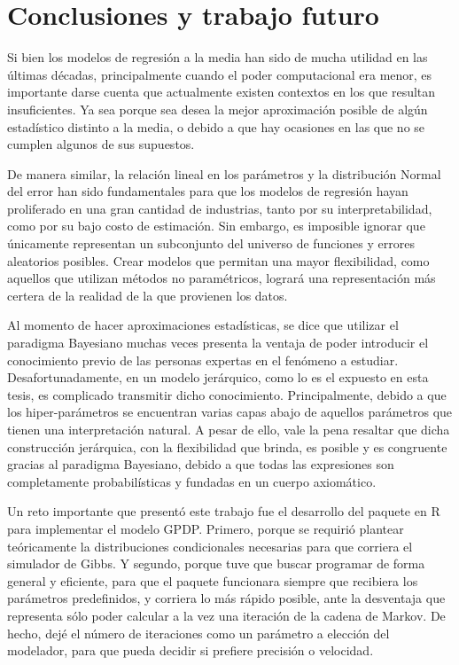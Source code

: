 \chapter[Conclusiones y trabajo futuro]{Conclusiones y trabajo futuro}

Si bien los modelos de regresi\'on a la media han sido de mucha utilidad en las \'ultimas d\'ecadas, principalmente cuando el poder computacional era menor, es importante darse cuenta que actualmente existen contextos en los que resultan insuficientes. Ya sea porque sea desea la mejor aproximaci\'on posible de alg\'un estad\'istico distinto a la media, o debido a que hay ocasiones en las que no se cumplen algunos de sus supuestos.

De manera similar, la relaci\'on lineal en los par\'ametros y la distribuci\'on Normal del error han sido fundamentales para que los modelos de regresi\'on hayan proliferado en una gran cantidad de industrias, tanto por su interpretabilidad, como por su bajo costo de estimaci\'on. Sin embargo, es imposible ignorar que \'unicamente representan un subconjunto del universo de funciones y errores aleatorios posibles. Crear modelos que permitan una mayor flexibilidad, como aquellos que utilizan m\'etodos no param\'etricos, lograr\'a una representaci\'on m\'as certera de la realidad de la que provienen los datos.

Al momento de hacer aproximaciones estad\'isticas, se dice que utilizar el paradigma Bayesiano muchas veces presenta la ventaja de poder introducir el conocimiento previo de las personas expertas en el fen\'omeno a estudiar. Desafortunadamente, en un modelo jer\'arquico, como lo es el expuesto en esta tesis, es complicado transmitir dicho conocimiento. Principalmente, debido a que los hiper-par\'ametros se encuentran varias capas abajo de aquellos par\'ametros que tienen una interpretaci\'on natural. A pesar de ello, vale la pena resaltar que dicha construcci\'on jer\'arquica, con la flexibilidad que brinda, es posible y es congruente gracias al paradigma Bayesiano, debido a que todas las expresiones son completamente probabil\'isticas y fundadas en un cuerpo axiom\'atico. 

Un reto importante que present\'o este trabajo fue el desarrollo del paquete en R para implementar el modelo GPDP. Primero, porque se requiri\'o plantear te\'oricamente la distribuciones condicionales necesarias para que corriera el simulador de Gibbs. Y segundo, porque tuve que buscar programar de forma general y eficiente, para que el paquete funcionara siempre que recibiera los par\'ametros predefinidos, y corriera lo m\'as r\'apido posible, ante la desventaja que representa s\'olo poder calcular a la vez una iteraci\'on de la cadena de Markov. De hecho, dej\'e el n\'umero de iteraciones como un par\'ametro a elecci\'on del modelador, para que pueda decidir si prefiere precisi\'on o velocidad.

